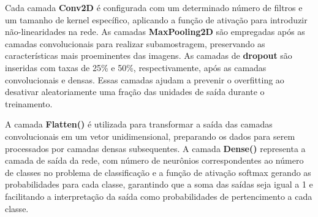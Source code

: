 Cada camada \textbf{Conv2D} é configurada com um determinado número de filtros e um tamanho de kernel específico, aplicando a função de ativação para introduzir não-linearidades na rede. As camadas \textbf{MaxPooling2D} são empregadas após as camadas convolucionais para realizar subamostragem, preservando as características mais proeminentes das imagens. As camadas de \textbf{dropout} são inseridas com taxas de 25\% e 50\%, respectivamente, após as camadas convolucionais e densas. Essas camadas ajudam a prevenir o overfitting ao desativar aleatoriamente uma fração das unidades de saída durante o treinamento.

A camada \textbf{Flatten()} é utilizada para transformar a saída das camadas convolucionais em um vetor unidimensional, preparando os dados para serem processados por camadas densas subsequentes. A camada \textbf{Dense()} representa a camada de saída da rede, com número de neurônios correspondentes ao número de classes no problema de classificação e a função de ativação softmax gerando as probabilidades para cada classe, garantindo que a soma das saídas seja igual a 1 e facilitando a interpretação da saída como probabilidades de pertencimento a cada classe.

